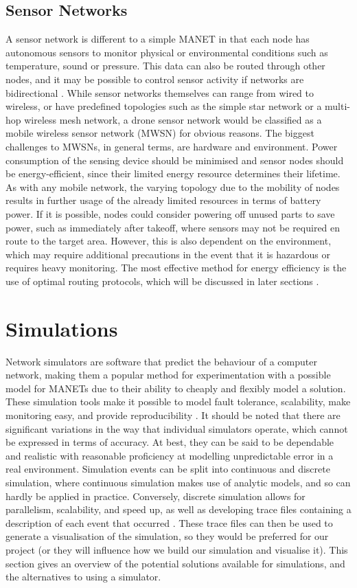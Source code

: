 \subsection{Sensor Networks}
A sensor network is different to a simple MANET in that each node has autonomous sensors to monitor physical or environmental conditions such as temperature, sound or pressure. This data can also be routed through other nodes, and it may be possible to control sensor activity if networks are bidirectional \cite{kazem2007}. While sensor networks themselves can range from wired to wireless, or have predefined topologies such as the simple star network or a multi-hop wireless mesh network, a drone sensor network would be classified as a mobile wireless sensor network (MWSN) for obvious reasons. 
The biggest challenges to MWSNs, in general terms, are hardware and environment. Power consumption of the sensing device should be minimised and sensor nodes should be energy-efficient, since their limited energy resource determines their lifetime. As with any mobile network, the varying topology due to the mobility of nodes results in further usage of the already limited resources in terms of battery power. If it is possible, nodes could consider powering off unused parts to save power, such as immediately after takeoff, where sensors may not be required en route to the target area. However, this is also dependent on the environment, which may require additional precautions in the event that it is hazardous or requires heavy monitoring. The most effective method for energy efficiency is the use of optimal routing protocols, which will be discussed in later sections \cite{shiny2012}.

\section{Simulations}
\label{simSoft}
Network simulators are software that predict the behaviour of a computer network, making them a popular method for experimentation with a possible model for MANETs due to their ability to cheaply and flexibly model a solution. These simulation tools make it possible to model fault tolerance, scalability, make monitoring easy, and provide reproducibility \cite{stuartkurkowski2005}. It should be noted that there are significant variations in the way that individual simulators operate, which cannot be expressed in terms of accuracy. At best, they can be said to be dependable and realistic with reasonable proficiency at modelling unpredictable error in a real environment. Simulation events can be split into continuous and discrete simulation, where continuous simulation makes use of analytic models, and so can hardly be applied in practice. Conversely, discrete simulation allows for parallelism, scalability, and speed up, as well as developing trace files containing a description of each event that occurred \cite{luchogie2006}. These trace files can then be used to generate a visualisation of the simulation, so they would be preferred for our project (or they will influence how we build our simulation and visualise it). This section gives an overview of the potential solutions available for simulations, and the alternatives to using a simulator.

